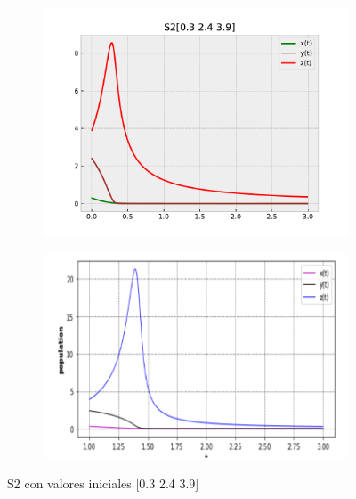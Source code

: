 \documentclass{wscpaperproc}
\theoremstyle{wsc}
\begin{document}
\begin{figure}[htpb]
	\centering
	\begin{subfigure}[b]{0.5\textwidth}
		\centering
		\includegraphics[width=\textwidth]{Simulations/S2[0.3 2.4 3.9].pdf}
	
		\label{fig:comparativa41}
	\end{subfigure}%
	\begin{subfigure}[b]{0.5\textwidth}
		\centering
		\includegraphics[width=\textwidth]{GraficasPaper/S2[1].png}
		\label{fig:comparativa42}
	\end{subfigure}
	\caption{S2 con valores iniciales [0.3 2.4 3.9]}

	\label{fig:comparacion5}
\end{figure}
\end{document}
